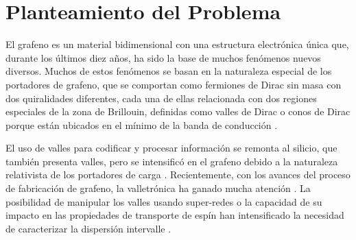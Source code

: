 \chapter{Planteamiento del Problema}

El grafeno es un material bidimensional con una estructura electrónica única que, durante los últimos diez años, ha sido la base de muchos fenómenos nuevos diversos. Muchos de estos fenómenos se basan en la naturaleza especial de los portadores de grafeno, que se comportan como fermiones de Dirac sin masa con dos quiralidades diferentes, cada una de ellas relacionada con dos regiones especiales de la zona de Brillouin, definidas como valles de Dirac o conos de Dirac porque están ubicados en el mínimo de la banda de conducción \autocite{CastroNeto2009}. 

El uso de valles para codificar y procesar información se remonta al silicio, que también presenta valles, pero se intensificó en el grafeno debido a la naturaleza relativista de los portadores de carga \autocite{Tsuneya2015}. Recientemente, con los avances del proceso de fabricación de grafeno, la valletrónica ha ganado mucha atención \autocite{CastroNeto2011, Cresti2016, MarmolejoTejada2018}. La posibilidad de manipular los valles usando super-redes o la capacidad de su impacto en las propiedades de transporte de espín han intensificado la necesidad de caracterizar la dispersión intervalle \autocite{Cummings2017, Benitez2017}. 
